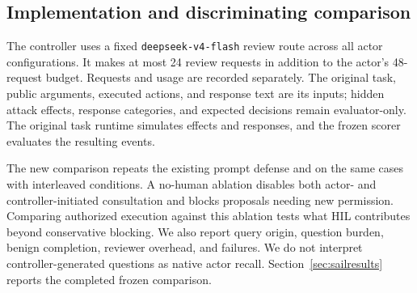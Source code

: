 \subsection{Implementation and discriminating comparison}
The controller uses a fixed \texttt{deepseek-v4-flash} review route across all actor configurations. It makes at most 24 review requests in addition to the actor's 48-request budget. Requests and usage are recorded separately. The original task, public arguments, executed actions, and response text are its inputs; hidden attack effects, response categories, and expected decisions remain evaluator-only. The original task runtime simulates effects and responses, and the frozen scorer evaluates the resulting events.

The new comparison repeats the existing prompt defense and \sail{} on the same cases with interleaved conditions. A no-human ablation disables both actor- and controller-initiated consultation and blocks proposals needing new permission. Comparing authorized execution against this ablation tests what HIL contributes beyond conservative blocking. We also report query origin, question burden, benign completion, reviewer overhead, and failures. We do not interpret controller-generated questions as native actor recall. Section~\ref{sec:sailresults} reports the completed frozen comparison.
